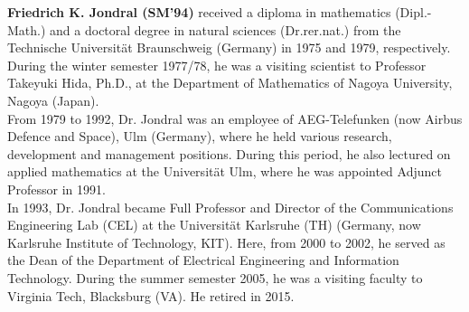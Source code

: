 \documentclass[journal, twocolumn]{IEEEtran}
\begin{document}
\begin{IEEEbiography}
{\textbf{Friedrich K. Jondral (SM'94)}} received a diploma in mathematics (Dipl.-Math.) and a doctoral degree in natural sciences (Dr.rer.nat.) from the Technische Universität Braunschweig (Germany) in 1975 and 1979, respectively. During the winter semester 1977/78, he was a visiting scientist to Professor Takeyuki Hida, Ph.D., at the Department of Mathematics of Nagoya University, Nagoya (Japan). \\
From 1979 to 1992, Dr. Jondral was an employee of AEG-Telefunken (now Airbus Defence and Space), Ulm (Germany), where he held various research, development and management positions. During this period, he also lectured on applied mathematics at the Universität Ulm, where he was appointed Adjunct Professor in 1991. \\
In 1993, Dr. Jondral became Full Professor and Director of the Communications Engineering Lab (CEL) at the Universität Karlsruhe (TH) (Germany, now Karlsruhe Institute of Technology, KIT). Here, from 2000 to 2002, he served as the Dean of the Department of Electrical Engineering and Information Technology. During the summer semester 2005, he was a visiting faculty to Virginia Tech, Blacksburg (VA). He retired in 2015.
\end{IEEEbiography}
\end{document}
